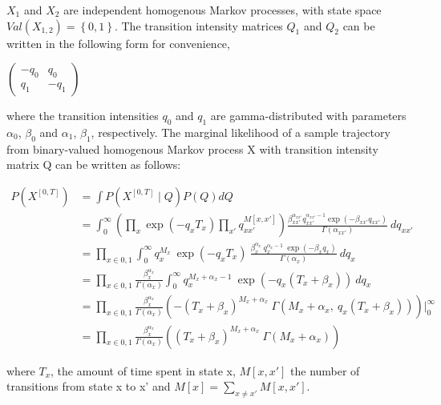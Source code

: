\documentclass[]{article}
\begin{document}
	$ X_{1} $ and $ X_{2} $ are independent homogenous Markov processes, with state space $ Val(X_{1, 2}) = \left\lbrace 0, 1 \right\rbrace $. The transition intensity matrices $ Q_{1} $ and $ Q_{2} $ can be written in the following form for convenience,
	\begin{center}
		\begin{math}
		\begin{pmatrix}
		-q_{0} & q_{0} \\
		q_{1} & -q_{1}
		\end{pmatrix}
		\end{math}\\
	\end{center}
	where the transition intensities $ q_{0} $ and $ q_{1} $ are gamma-distributed with parameters $ \alpha_{0}$, $ \beta_{0} $ and $ \alpha_{1} $, $ \beta_{1} $, respectively. The marginal likelihood of a sample trajectory from binary-valued homogenous Markov process X with transition intensity matrix Q can be written as follows:
	
	\begin{align}
	P(X^{[0, T]}) & = \int  P(X^{[0, T]}\mid Q)P(Q) dQ \\ & = \int_{0}^{\infty} \left( \prod_{x} \exp(-q_{x}T_{x}) \prod_{x'} q_{xx'}^{M[x, x']}\right) \frac{\beta_{xx'}^{\alpha_{xx'}}{q_{xx'}^{\alpha_{xx'}-1}}\exp(-\beta_{xx'}q_{xx'})}{\Gamma(\alpha_{xx'})} \ dq_{xx'} \\ & = \prod_{x\in{0,1}}\int_{0}^{\infty} q_{x}^{M_{x}} \ \exp(-q_{x}T_{x}) \  \frac{\beta_{x}^{\alpha_{x}} \ q_{x}^{\alpha_{x}-1}\ \exp(-\beta_{x}q_{x})}{\Gamma(\alpha_{x})} \ dq_{x} \\ & = \prod_{x\in{0,1}} \frac{\beta_{x}^{\alpha_{x}}}{\Gamma(\alpha_{x})} \int_{0}^{\infty} q_{x}^{M_{x} + \alpha_{x} -1} \ \exp(-q_{x}(T_{x}+\beta_{x})) \ dq_{x} \\ & = \prod_{x\in{0,1}} \frac{\beta_{x}^{\alpha_{x}}}{\Gamma(\alpha_{x})} \left( -(T_{x}+\beta_{x})^{M_{x} + \alpha_{x}}\ \Gamma(M_{x} + \alpha_{x}, \ q_{x}(T_{x}+\beta_{x})) \right) \Big|_0^\infty  \\ & = \prod_{x\in{0,1}} \frac{\beta_{x}^{\alpha_{x}}}{\Gamma(\alpha_{x})} \left( (T_{x}+\beta_{x})^{M_{x} + \alpha_{x}}\ \Gamma(M_{x} + \alpha_{x}) \right)
	\label{eq:Marg_traj}
	\end{align}

	where $ T_{x} $, the amount of time spent in state x, $ M[x,x'] $ the number of transitions from state x to x' and  $ M[x] = \sum_{x\neq x'}M[x,x'] $.\\
	
\end{document}
